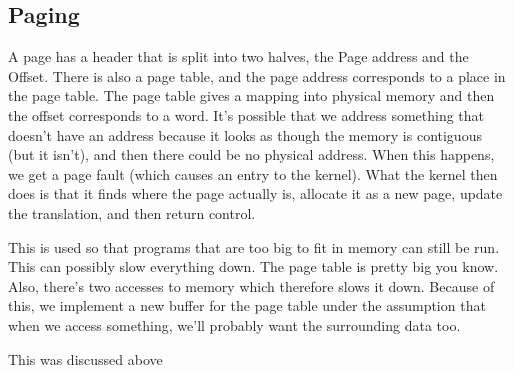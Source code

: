 \documentclass[11pt,a4paper,titlepage,dvipsnames,cmyk]{scrartcl}
\begin{document}
\subsection{Paging}%
\label{sub:Paging}
A page has a header that is split into two halves, the Page address and the
Offset. There is also a page table, and the page address corresponds to a
place in the page table. The page table gives a mapping into physical
memory and then the offset corresponds to a word. It's possible that we
address something that doesn't have an address because it looks as though
the memory is contiguous (but it isn't), and then there could be no
physical address. When this happens, we get a page fault (which causes an
entry to the kernel). What the kernel then does is that it finds where the
page actually is, allocate it as a new page, update the translation, and
then return control.

This is used so that programs that are too big to fit in memory can still
be run. This can possibly slow everything down. The page table is pretty
big you know. Also, there's two accesses to memory which therefore slows
it down. Because of this, we implement a new buffer for the page table
under the assumption that when we access something, we'll probably want
the surrounding data too.

This was discussed above 
\end{document}
